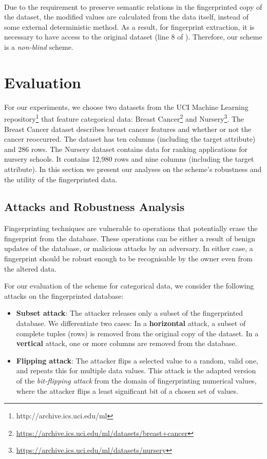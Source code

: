 \documentclass[runningheads]{llncs}
\begin{document}
\paragraph{}
Due to the requirement to preserve semantic relations in the fingerprinted copy of the dataset, the modified values are calculated from the data itself, instead of some external deterministic method. 
As a result, for fingerprint extraction, it is necessary to have access to the original dataset (line 8 of ). Therefore, our scheme is a \textit{non-blind} scheme. 

\section{Evaluation}\label{sec:evaluation}
For our experiments, we choose two datasets from the UCI Machine Learning repository\footnote{http://archive.ics.uci.edu/ml} that feature categorical data: Breast Cancer\footnote{\url{https://archive.ics.uci.edu/ml/datasets/breast+cancer}} and Nursery\footnote{\url{https://archive.ics.uci.edu/ml/datasets/nursery}}.
The Breast Cancer dataset describes breast cancer features and whether or not the cancer reoccurred. The dataset has ten columns (including the target attribute) and 286 rows. 
The Nursery dataset contains data for ranking applications for nursery schools. It contains 12,980 rows and nine columns (including the target attribute).
In this section we present our analyses on the scheme's robustness and the utility of the fingerprinted data.

\subsection{Attacks and Robustness Analysis} \label{sec:robustness}
Fingerprinting techniques are vulnerable to operations that potentially erase the fingerprint from the database.
These operations can be either a result of benign updates of the database, or malicious attacks by an adversary. 
In either case, a fingerprint should be robust enough to be recognisable by the owner even from the altered data.

For our evaluation of the scheme for categorical data, we consider the following attacks on the fingerprinted database:
\begin{itemize}
    \item \textbf{Subset attack}: The attacker releases only a subset of the fingerprinted database.
    We differentiate two cases:
    In a \textbf{horizontal} attack, a subset of complete tuples (rows) is removed from the original copy of the dataset.
    In a \textbf{vertical} attack, one or more columns are removed from the database. 
    \item \textbf{Flipping attack}: The attacker flips a selected value to a random, valid one, and repeats this for multiple data values.
    This attack is the adapted version of the \textit{bit-flipping attack} from the domain of fingerprinting numerical values, where the attacker flips a least significant bit of a chosen set of values.
\end{itemize}
\end{document}
